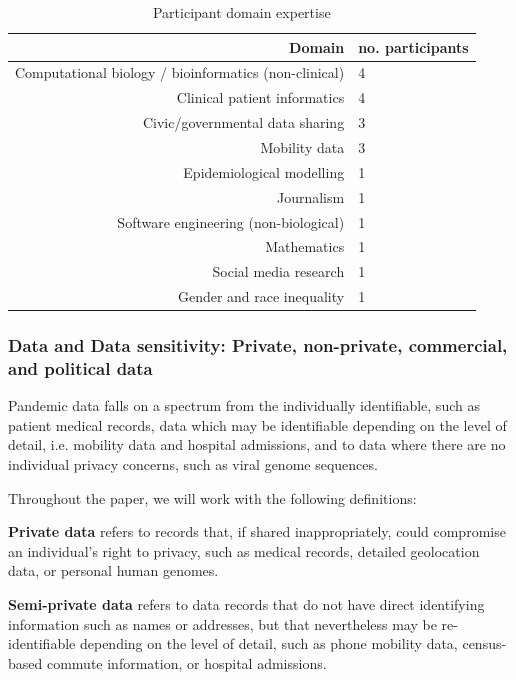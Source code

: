 \documentclass{CUP-JNL-DAP}%
\begin{document}
\begin{table}[ht!]
  \begin{center}
    \caption{Participant domain expertise}
    \label{tab:professions}
    \begin{tabular}{r|l} %
      \textbf{Domain} & \textbf{no. participants} \\
      \hline
      Computational biology / bioinformatics (non-clinical)  & 4\\
      Clinical patient informatics & 4\\
      Civic/governmental data sharing & 3 \\
      Mobility data & 3\\
      Epidemiological modelling & 1\\
      Journalism & 1\\
      Software engineering (non-biological) & 1\\
      Mathematics & 1\\      
      Social media research & 1\\      
      Gender and race inequality & 1\\      
    \end{tabular}
  \end{center}
\end{table}

\subsubsection{Data and Data sensitivity: Private, non-private, commercial, and political data}

Pandemic data falls on a spectrum from the individually identifiable, such as patient medical records, data which may be identifiable depending on the level of detail, i.e. mobility data and hospital admissions, and to data where there are no individual privacy concerns, such as viral genome sequences.  

Throughout the paper, we will work with the following definitions: 

\textbf{Private data} refers to records that, if shared inappropriately, could compromise an individual's right to privacy, such as medical records, detailed geolocation data, or personal human genomes. 

\textbf{Semi-private data} refers to data records that do not have direct identifying information such as names or addresses, but that nevertheless may be re-identifiable depending on the level of detail, such as phone mobility data, census-based commute information, or hospital admissions.
\end{document}
